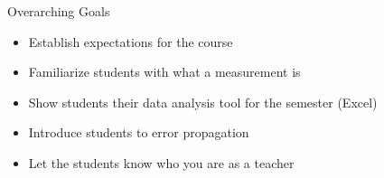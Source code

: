 \documentclass{beamer}
\begin{document}
\begin{frame}{Overarching Goals}
  \begin{itemize}
  \item Establish expectations for the course
  \item Familiarize students with what a measurement is
  \item Show students their data analysis tool for the semester (Excel)
  \item Introduce students to error propagation
  \item Let the students know who you are as a teacher
  \end{itemize}
\end{frame}
\end{document}
